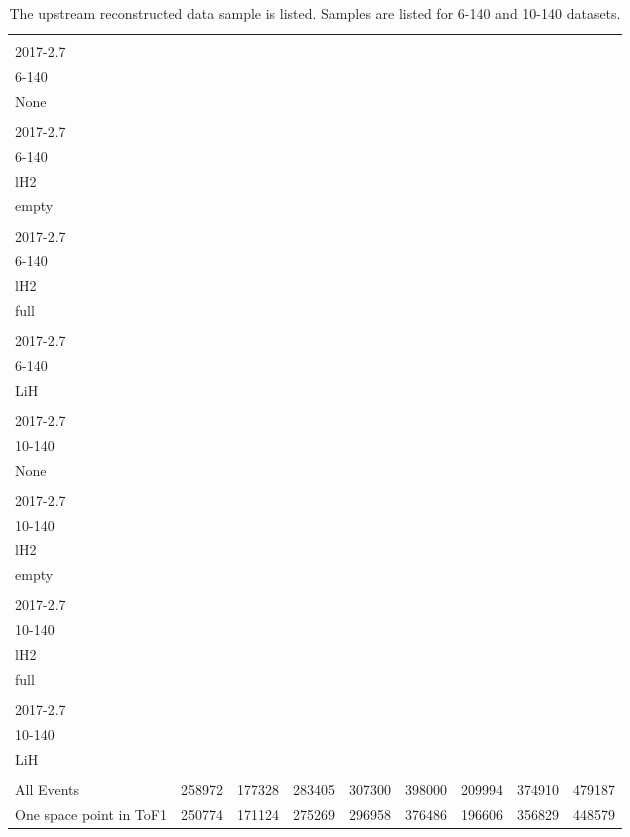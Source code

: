 \begin{landscape}
\begin{table}
\centering
\caption{The upstream reconstructed data sample is listed.  Samples are listed for 6-140 and 10-140 datasets.\label{tab:data_cuts_summary_0_1}}
\begin{tabular}[pos]{l|cccccccc}
                                                   & \splitcell{\\2017-2.7\\6-140\\None\\} & \splitcell{\\2017-2.7\\6-140\\lH2\\empty\\} & \splitcell{\\2017-2.7\\6-140\\lH2\\full\\} & \splitcell{\\2017-2.7\\6-140\\LiH\\} & \splitcell{\\2017-2.7\\10-140\\None\\} & \splitcell{\\2017-2.7\\10-140\\lH2\\empty\\} & \splitcell{\\2017-2.7\\10-140\\lH2\\full\\} & \splitcell{\\2017-2.7\\10-140\\LiH\\} \\
\hline                                            
All Events                                         &  258972  &  177328  &  283405  &  307300  &  398000  &  209994  &  374910  &  479187  \\
\hline                                            
One space point in ToF1                            &  250774  &  171124  &  275269  &  296958  &  376486  &  196606  &  356829  &  448579  \\

\end{tabular}
\end{table}
\end{landscape}

